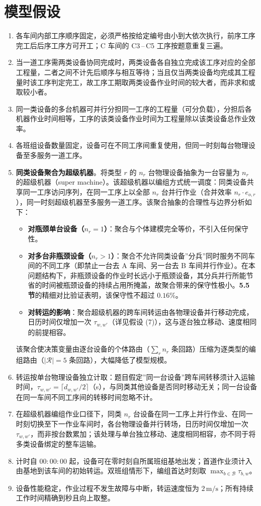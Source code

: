 \documentclass[12pt,a4paper]{ctexart}
\begin{document}
\section{模型假设}
\begin{enumerate}[label=(\arabic*),leftmargin=2.2em]
\item 各车间内部工序顺序固定，必须严格按给定编号由小到大依次执行，前序工序完工后后序工序方可开工；C 车间的 C3\,--\,C5 工序按题意重复三遍。
\item 当一道工序需两类设备协同完成时，两类设备各自独立完成该工序对应的全部工程量，二者之间不计先后顺序与相互等待；当且仅当两类设备均完成其工程量时该工序判定完工，故工序工期取两类设备作业时间的较大者，而非求和或取较小者。
\item 同一类设备的多台机器可并行分担同一工序的工程量（可分负载），分担后各机器作业时间相等，工序的该类设备作业时间为工程量除以该类设备总作业效率。
\item 各班组设备数量固定，设备可在不同工序间重复使用，但同一时刻每台物理设备至多服务一道工序。
\item \textbf{同类设备聚合为超级机器}。将类型 $r$ 的 $n_r$ 台物理设备抽象为一台容量为 $n_r$ 的超级机器（super machine）。该超级机器以编组方式统一调度：同类设备共享同一工序访问序列，在同一工序上以全部 $n_r$ 台并行作业（合并效率 $n_r\cdot e_{o,r}$），同一时刻超级机器至多服务一道工序。该聚合抽象的合理性与边界分析如下：
\begin{itemize}
\item \textbf{对瓶颈单台设备（$n_r=1$）}：聚合与个体建模完全等价，不引入任何保守性。
\item \textbf{对多台非瓶颈设备（$n_r>1$）}：聚合不允许同类设备”分兵”同时服务不同车间的不同工序（即禁止一台去 A 车间、另一台去 B 车间并行作业）。在本问题结构下，非瓶颈设备的作业时长远小于瓶颈设备，其分兵并行所能节省的时间被瓶颈设备的持续占用所掩盖，故聚合带来的保守性极小。\textbf{5.5 节}的精细对比验证表明，该保守性不超过 $0.16\%$。
\item \textbf{对转运的影响}：聚合超级机器的跨车间转运由各物理设备并行移动完成，日历时间仅增加一次 $\tau_{w,w'}$（详见假设 (7)），这与逐台独立移动、速度相同的前提相容。
\end{itemize}
该聚合使决策变量由逐台设备的个体路由（$\sum_r n_r$ 条回路）压缩为逐类型的编组路由（$|\mathcal{R}|=5$ 条回路），大幅降低了模型规模。
\item 转运按单台物理设备独立计取：题目假定”同一台设备”跨车间转移须计入运输时间，$\tau_{w,w'}=\lceil d_{w,w'}/2\rceil$（s），与同类其他设备是否同时移动无关；同一台设备在同一车间不同工序间的转移时间忽略不计。
\item 在超级机器编组作业口径下，同类 $n_r$ 台设备在同一工序上并行作业、在同一时刻切换至下一作业车间时，各台物理设备并行转场，日历时间仅增加一次 $\tau_{w,w'}$，而非按台数累加；该处理与单台独立移动、速度相同相容，亦不同于将多类设备绑定的整车运输。
\item 计时自 $00{:}00{:}00$ 起，设备可在零时刻自所属班组基地出发；首道作业须计入由基地到该车间的初始转运。双班组情形下，编组首达时刻取 $\max_{b\in\mathcal{B}}\tau_{b,w}$。
\item 设备性能稳定，作业过程不发生故障与中断，转运速度恒为 $2\,\mathrm{m/s}$；所有持续工作时间精确到秒且向上取整。
\end{enumerate}
\end{document}
